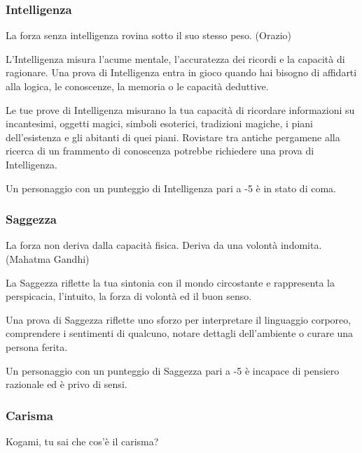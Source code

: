 \begin{multicols}{2}
\subsubsection{Intelligenza}\label{intelligenza}

\begin{enfasi}{
La forza senza intelligenza rovina sotto il suo stesso peso. (Orazio)
}\end{enfasi}

L'Intelligenza misura l'acume mentale, l'accuratezza dei ricordi e la capacità di ragionare.
Una prova di Intelligenza entra in gioco quando hai bisogno di affidarti alla logica, le conoscenze, la memoria o le capacità deduttive.

Le tue prove di Intelligenza misurano la tua capacità di ricordare informazioni su incantesimi, oggetti magici, simboli esoterici, tradizioni magiche, i piani dell'esistenza e gli abitanti di quei piani. Rovistare tra antiche pergamene alla ricerca di un frammento di conoscenza potrebbe richiedere una prova di Intelligenza.

Un personaggio con un punteggio di Intelligenza pari a -5 è in stato di coma.

\subsubsection{Saggezza}\label{saggezza}

\begin{enfasi}{
La forza non deriva dalla capacità fisica. Deriva da una volontà indomita. (Mahatma Gandhi)}\end{enfasi}

La Saggezza riflette la tua sintonia con il mondo circostante e rappresenta la perspicacia, l'intuito, la forza di volontà ed il buon senso.

Una prova di Saggezza riflette uno sforzo per interpretare il linguaggio corporeo, comprendere i sentimenti di qualcuno, notare dettagli dell'ambiente o curare una persona ferita.

Un personaggio con un punteggio di Saggezza pari a -5 è incapace di pensiero razionale ed è privo di sensi.

\subsubsection{Carisma}\label{carisma}

\begin{enfasi}{
Kogami, tu sai che cos'è il carisma?

}
\end{enfasi}
\end{multicols}

